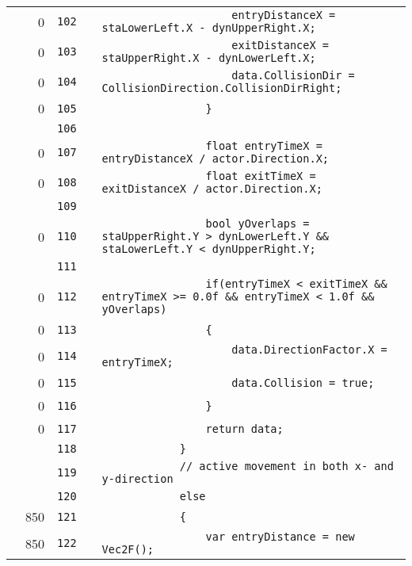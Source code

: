 \documentclass[a4paper,landscape,10pt]{article}
\begin{document}
\begin{longtable}[l]{lrrll}
\cellcolor{red} & 0 & \verb~102~ & & \verb~                    entryDistanceX = staLowerLeft.X - dynUpperRight.X;~\\
\cellcolor{red} & 0 & \verb~103~ & & \verb~                    exitDistanceX = staUpperRight.X - dynLowerLeft.X;~\\
\cellcolor{red} & 0 & \verb~104~ & & \verb~                    data.CollisionDir = CollisionDirection.CollisionDirRight;~\\
\cellcolor{red} & 0 & \verb~105~ & & \verb~                }~\\
\cellcolor{gray} &  & \verb~106~ & & \verb~~\\
\cellcolor{red} & 0 & \verb~107~ & & \verb~                float entryTimeX = entryDistanceX / actor.Direction.X;~\\
\cellcolor{red} & 0 & \verb~108~ & & \verb~                float exitTimeX = exitDistanceX / actor.Direction.X;~\\
\cellcolor{gray} &  & \verb~109~ & & \verb~~\\
\cellcolor{red} & 0 & \verb~110~ & & \verb~                bool yOverlaps = staUpperRight.Y > dynLowerLeft.Y && staLowerLeft.Y < dynUpperRight.Y;~\\
\cellcolor{gray} &  & \verb~111~ & & \verb~~\\
\cellcolor{red} & 0 & \verb~112~ & & \verb~                if(entryTimeX < exitTimeX && entryTimeX >= 0.0f && entryTimeX < 1.0f && yOverlaps)~\\
\cellcolor{red} & 0 & \verb~113~ & & \verb~                {~\\
\cellcolor{red} & 0 & \verb~114~ & & \verb~                    data.DirectionFactor.X = entryTimeX;~\\
\cellcolor{red} & 0 & \verb~115~ & & \verb~                    data.Collision = true;~\\
\cellcolor{red} & 0 & \verb~116~ & & \verb~                }~\\
\cellcolor{red} & 0 & \verb~117~ & & \verb~                return data;~\\
\cellcolor{gray} &  & \verb~118~ & & \verb~            }~\\
\cellcolor{gray} &  & \verb~119~ & & \verb~            // active movement in both x- and y-direction~\\
\cellcolor{gray} &  & \verb~120~ & & \verb~            else~\\
\cellcolor{green} & 850 & \verb~121~ & & \verb~            {~\\
\cellcolor{green} & 850 & \verb~122~ & & \verb~                var entryDistance = new Vec2F();~\\

\end{longtable}
\end{document}
